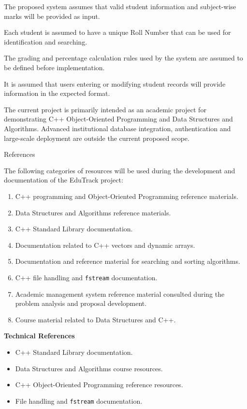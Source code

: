 \documentclass[11pt,a4paper]{article}
\newcommand{\blueheading}[1]{%
  {\sffamily\color{TitleBlue}\fontsize{15}{18}\selectfont #1}%
}
\begin{document}
\vspace{3mm}
\begin{answerbox}
The proposed system assumes that valid student information and subject-wise marks will be provided as input.

Each student is assumed to have a unique Roll Number that can be used for identification and searching.

The grading and percentage calculation rules used by the system are assumed to be defined before implementation.

It is assumed that users entering or modifying student records will provide information in the expected format.

The current project is primarily intended as an academic project for demonstrating C++ Object-Oriented Programming and Data Structures and Algorithms. Advanced institutional database integration, authentication and large-scale deployment are outside the current proposed scope.
\end{answerbox}

\newpage

\blueheading{References}

\vspace{8mm}
\begin{answerbox}
The following categories of resources will be used during the development and documentation of the EduTrack project:

\begin{enumerate}[leftmargin=7mm,itemsep=2pt,topsep=3pt,parsep=0pt]
\item C++ programming and Object-Oriented Programming reference materials.
\item Data Structures and Algorithms reference materials.
\item C++ Standard Library documentation.
\item Documentation related to C++ vectors and dynamic arrays.
\item Documentation and reference material for searching and sorting algorithms.
\item C++ file handling and \texttt{fstream} documentation.
\item Academic management system reference material consulted during the problem analysis and proposal development.
\item Course material related to Data Structures and C++.
\end{enumerate}

\vspace{6mm}
\textbf{Technical References}

\begin{itemize}[leftmargin=7mm,itemsep=2pt,topsep=3pt,parsep=0pt]
\item C++ Standard Library documentation.
\item Data Structures and Algorithms course resources.
\item C++ Object-Oriented Programming reference resources.
\item File handling and \texttt{fstream} documentation.
\end{itemize}
\end{answerbox}
\end{document}
